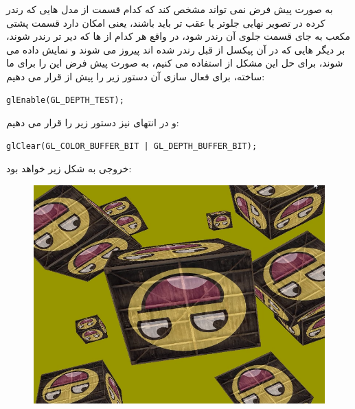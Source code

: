 \documentclass[a4paper, 12pt]{book}
\newcommand{\lrit}[1]{\lr{\textit{#1}}}
\begin{document}
    به صورت پیش فرض  نمی تواند مشخص کند که کدام قسمت از مدل هایی که رندر کرده در تصویر نهایی جلوتر یا عقب تر باید باشند، یعنی امکان دارد قسمت پشتی مکعب به جای قسمت جلوی آن رندر شود، در واقع هر کدام از  ها که دیر تر رندر شوند، بر دیگر  هایی که در آن پیکسل از قبل رندر شده اند پیروز می شوند و نمایش داده می شوند، برای حل این مشکل از  استفاده می کنیم،  به صورت پیش فرض این  را برای ما ساخته، برای فعال سازی آن دستور زیر را پیش از  قرار می دهیم:

    \begin{LTR}
    \small
        \begin{lstlisting}[style=C++Style,caption=\lrit{enabling depth buffer}]
glEnable(GL_DEPTH_TEST);
        \end{lstlisting}
    \end{LTR}
    \normalsize
    \vspace*{0.3cm}

    \newpage
    و در انتهای  نیز دستور زیر را قرار می دهیم:

        \begin{LTR}
    \small
        \begin{lstlisting}[style=C++Style,caption=\lrit{clearing depth buffer for next frame}]
glClear(GL_COLOR_BUFFER_BIT | GL_DEPTH_BUFFER_BIT);
        \end{lstlisting}
    \end{LTR}
    \normalsize
    \vspace*{0.3cm}

    خروجی به شکل زیر خواهد بود:
    \begin{figure}[ht]
    \centering
    \href{https://github.com/devprofile98/shm}{
        \includegraphics[width=13cm]{images/3d.png}
    }
    \caption{}
    \label{fig:my_label}
\end{figure}
\end{document}
